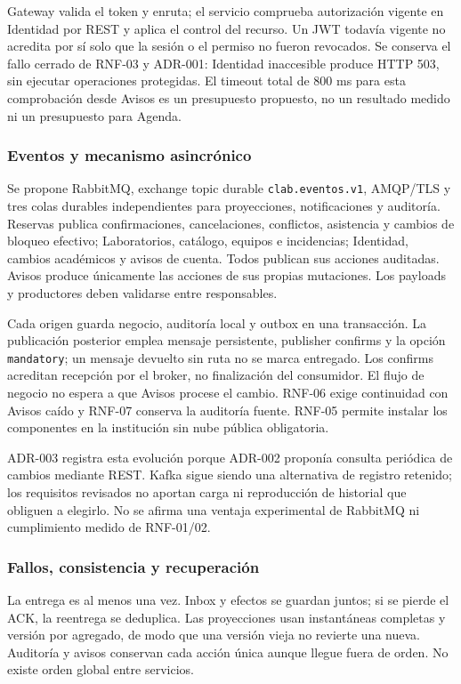 Gateway valida el token y enruta; el servicio comprueba autorización vigente
en Identidad por REST y aplica el control del recurso. Un JWT todavía
vigente no acredita por sí solo que la sesión o el permiso no fueron
revocados. Se conserva el fallo cerrado de RNF-03 y ADR-001: Identidad
inaccesible produce HTTP 503, sin ejecutar operaciones protegidas. El
timeout total de 800 ms para esta comprobación desde Avisos es un presupuesto
propuesto, no un resultado medido ni un presupuesto para Agenda.

\subsubsection{Eventos y mecanismo asincrónico}
Se propone RabbitMQ, exchange topic durable \texttt{clab.eventos.v1},
AMQP/TLS y tres colas durables independientes para proyecciones,
notificaciones y auditoría. Reservas publica confirmaciones, cancelaciones,
conflictos, asistencia y cambios de bloqueo efectivo; Laboratorios,
catálogo, equipos e incidencias; Identidad, cambios académicos y avisos de
cuenta. Todos publican sus acciones auditadas. Avisos produce únicamente
las acciones de sus propias mutaciones. Los payloads y productores deben
validarse entre responsables.

Cada origen guarda negocio, auditoría local y outbox en una transacción.
La publicación posterior emplea mensaje persistente, publisher confirms y
la opción \texttt{mandatory}; un mensaje devuelto sin ruta no se marca
entregado. Los confirms acreditan recepción por el broker, no finalización
del consumidor\cite{nixonRabbitConfirms}. El flujo de negocio no espera a
que Avisos procese el cambio. RNF-06 exige continuidad con Avisos caído y
RNF-07 conserva la auditoría fuente\cite{nixonPfcRNF}. RNF-05 permite
instalar los componentes en la institución sin nube pública obligatoria.

ADR-003 registra esta evolución porque ADR-002 proponía consulta periódica
de cambios mediante REST\cite{nixonPfcADR002}. Kafka sigue siendo una
alternativa de registro retenido; los requisitos revisados no aportan carga
ni reproducción de historial que obliguen a elegirlo. No se afirma una
ventaja experimental de RabbitMQ ni cumplimiento medido de RNF-01/02.

\subsubsection{Fallos, consistencia y recuperación}
La entrega es al menos una vez. Inbox y efectos se guardan juntos; si se
pierde el ACK, la reentrega se deduplica. Las proyecciones usan instantáneas
completas y versión por agregado, de modo que una versión vieja no revierte
una nueva. Auditoría y avisos conservan cada acción única aunque llegue
fuera de orden. No existe orden global entre servicios.

